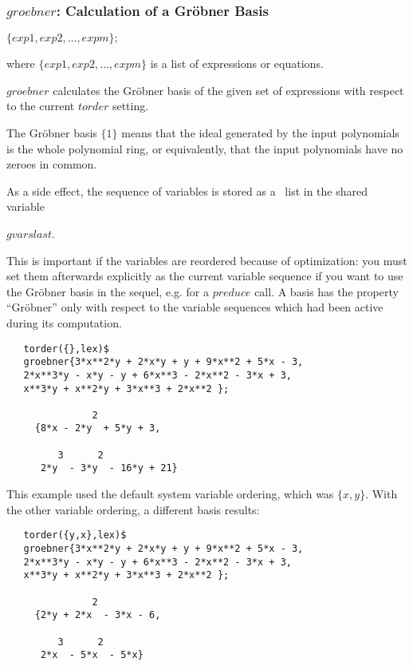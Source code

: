 \subsubsection{$groebner$: Calculation of a Gr\"obner Basis}
\begin{description}
\item[{\it groebner}] $\{exp1, exp2, \ldots , expm\}; $

where $\{exp1, exp2, \ldots , expm\}$ is a list of
expressions or equations.

$groebner$ calculates the Gr\"obner basis of the given set of
expressions with respect to the current $torder$ setting.

The Gr\"obner basis $\{1\}$ means that the ideal generated by the
input polynomials is the whole polynomial ring, or equivalently, that
the input polynomials have no zeroes in common.

As a side effect, the sequence of variables is stored as a \REDUCE \  list
in the shared variable
\begin{center}
$gvarslast$.
\end{center}

This is important if the variables are reordered because of optimization:
you must set them afterwards explicitly as the current variable sequence
if you want to use the Gr\"obner basis in the sequel, e.g. for a
$preduce$ call. A basis has the property ``Gr\"obner'' only with respect
to the variable sequences which had been active during its computation.
\end{description}

\example {}
\begin{verbatim}
   torder({},lex)$
   groebner{3*x**2*y + 2*x*y + y + 9*x**2 + 5*x - 3,
   2*x**3*y - x*y - y + 6*x**3 - 2*x**2 - 3*x + 3,
   x**3*y + x**2*y + 3*x**3 + 2*x**2 };

               2
     {8*x - 2*y  + 5*y + 3,

         3      2
      2*y  - 3*y  - 16*y + 21}
\end{verbatim}


This example used the default system variable ordering, which was
$\{x,y\}$. With the other variable ordering, a different basis results:

\begin{verbatim}
   torder({y,x},lex)$
   groebner{3*x**2*y + 2*x*y + y + 9*x**2 + 5*x - 3,
   2*x**3*y - x*y - y + 6*x**3 - 2*x**2 - 3*x + 3,
   x**3*y + x**2*y + 3*x**3 + 2*x**2 };

               2
     {2*y + 2*x  - 3*x - 6,

         3      2
      2*x  - 5*x  - 5*x}
\end{verbatim}


